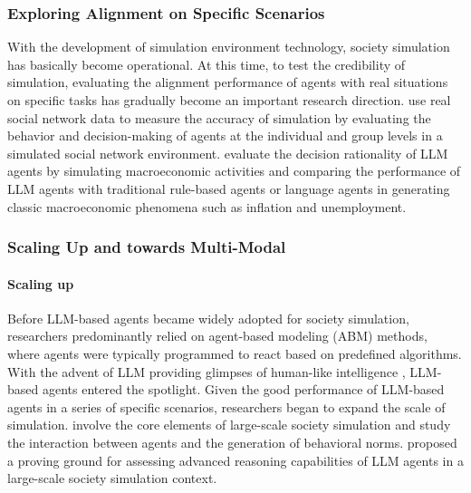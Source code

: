 \subsubsection{Exploring Alignment on Specific Scenarios}
With the development of simulation environment technology, society simulation has basically become operational. At this time, to test the credibility of simulation, evaluating the alignment performance of agents with real situations on specific tasks has gradually become an important research direction. \cite{gao2023s3} use real social network data to measure the accuracy of simulation by evaluating the behavior and decision-making of agents at the individual and group levels in a simulated social network environment. \cite{li2024econagent} evaluate the decision rationality of LLM agents by simulating macroeconomic activities and comparing the performance of LLM agents with traditional rule-based agents or language agents in generating classic macroeconomic phenomena such as inflation and unemployment.

\subsubsection{Scaling Up and towards Multi-Modal}
\paragraph{Scaling up} Before LLM-based agents became widely adopted for society simulation, researchers predominantly relied on agent-based modeling (ABM) methods, where agents were typically programmed to react based on predefined algorithms. With the advent of LLM providing glimpses of human-like intelligence \cite{browning2023personhood}, LLM-based agents entered the spotlight. Given the good performance of LLM-based agents in a series of specific scenarios, researchers began to expand the scale of simulation. \cite{mou2024unveiling, ren2024emergence} involve the core elements of large-scale society simulation and study the interaction between agents and the generation of behavioral norms. \cite{wu2024enhance} proposed a proving ground for assessing advanced reasoning capabilities of LLM agents in a large-scale society simulation context.

